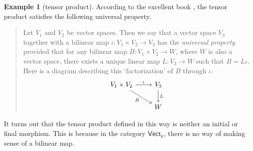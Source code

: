\documentclass[a4paper,10pt]{scrreprt}
\theoremstyle{definition}
\newtheorem{example}{Example}[section]
\theoremstyle{plain}
\theoremstyle{remark}
\begin{document}
\begin{example}[tensor product]
  \label{eg:universalpropertyoftensorproduct}
  According to the excellent book \cite{sontz-principal-bundles-classical}, the tensor product satisfies the following universal property.
  \begin{quote}
    Let $V_{1}$ and $V_{2}$ be vector spaces. Then we say that a vector space $V_{3}$ together with a bilinear map $\iota\colon V_{1} \times V_{2} \to V_{3}$ has the \emph{universal property} provided that for any bilinear map $B\colon V_{1} \times V_{2} \to W$, where $W$ is also a vector space, there exists a unique linear map $L\colon V_{3} \to W$ such that $B = L\iota$. Here is a diagram describing this `factorization' of $B$ through $\iota$:
    \begin{equation*}
      \begin{tikzcd}
        V_{1} \times V_{2} \arrow[r, "\iota"] \arrow[rd, swap, "B"] & V_{3} \arrow[d, "L"] \\
        & W
      \end{tikzcd}
    \end{equation*}
  \end{quote}

  It turns out that the tensor product defined in this way is neither an initial or final morphism. This is because in the category $\mathsf{Vect}_{k}$, there is no way of making sense of a bilinear map. 
\end{example}
\end{document}
